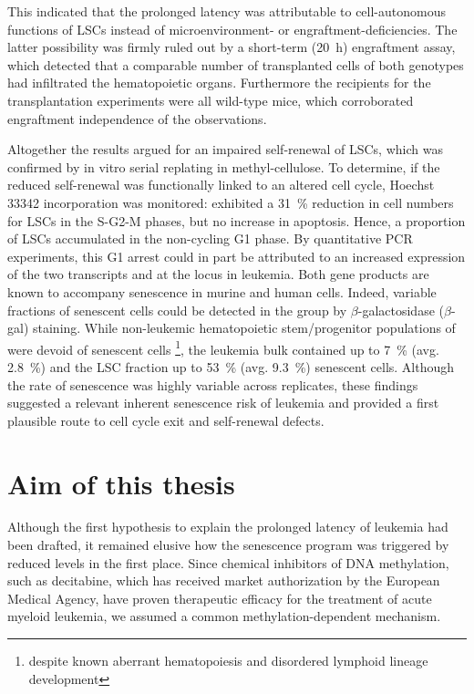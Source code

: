 This indicated that the prolonged latency was attributable to cell-autonomous functions of LSCs instead of microenvironment- or engraftment-deficiencies. The latter possibility was firmly ruled out by a short-term (\SI{20}{\hour}) engraftment assay, which detected that a comparable number of transplanted cells of both genotypes had infiltrated the hematopoietic organs. Furthermore the recipients for the transplantation experiments were all wild-type mice, which corroborated engraftment independence of the observations. 

Altogether the results argued for an impaired self-renewal of LSCs, which was confirmed by in vitro serial replating in methyl-cellulose. To determine, if the reduced self-renewal was functionally linked to an altered cell cycle, Hoechst\,\num{33342} incorporation was monitored: \dnmtchip \mllafnine exhibited a \SI{31}{\percent} reduction in cell numbers for LSCs in the S-G2-M phases, but no increase in apoptosis. Hence, a proportion of \dnmtchip LSCs accumulated in the non-cycling G1 phase. By quantitative PCR experiments, this G1 arrest could in part be attributed to an increased expression of the two transcripts  and  at the  locus in \dnmtchip leukemia. Both gene products are known to accompany senescence in murine and human cells. Indeed, variable fractions of senescent cells could be detected in the \dnmtchip group by \ensuremath{\beta}-galactosidase (\ensuremath{\beta}-gal) staining. While non-leukemic hematopoietic stem/progenitor populations of \dnmtchip were devoid of senescent cells \footnote{despite known aberrant hematopoiesis and disordered lymphoid lineage development\cite{Broeske2009}}, the leukemia bulk contained up to \SI{7}{\percent} (avg. \SI{2.8}{\percent}) and the LSC fraction up to \SI{53}{\percent} (avg. \SI{9.3}{\percent}) senescent cells. Although the rate of senescence was highly variable across replicates, these findings suggested a relevant inherent senescence risk of \dnmtchip \mllafnine leukemia and provided a first plausible route to cell cycle exit and self-renewal defects. 

\section{Aim of this thesis}
\label{chap:i:abridged:project:aim}

Although the first hypothesis to explain the prolonged latency of \dnmtchip \mllafnine leukemia had been drafted, it remained elusive how the senescence program was triggered by reduced  levels in the first place. Since chemical inhibitors of DNA methylation, such as decitabine, which has received market authorization by the European Medical Agency, have proven therapeutic efficacy for the treatment of acute myeloid leukemia\cite{Stresemann2006,Hollenbach2010}, we assumed a common methylation-dependent mechanism.

